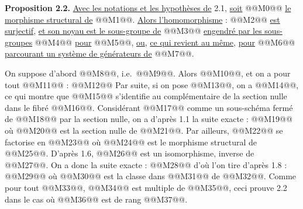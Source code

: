 
\textbf{Proposition 2.2.} \uline{Avec les notations et les hypothèses de} 2.1, \uline{soit} @@M0@@ \uline{le morphisme structural de} @@M1@@. \uline{Alors l'homomorphisme} :
@@M2@@
\uline{est surjectif}, \uline{et son noyau est le sous-groupe de} @@M3@@ \uline{engendré par les sous-groupes} @@M4@@ \uline{pour} @@M5@@, \uline{ou}, \uline{ce qui revient au même}, \uline{pour} @@M6@@ \uline{parcourant un système de générateurs de} @@M7@@.

On suppose d'abord @@M8@@, i.e.\ @@M9@@. Alors @@M10@@, et on a pour tout @@M11@@ :
@@M12@@
Par suite, si on pose @@M13@@, on a @@M14@@, ce qui montre que @@M15@@ s'identifie au complémentaire de la section nulle dans le fibré @@M16@@. Considérant @@M17@@ comme un sous-schéma fermé de @@M18@@ par la section nulle, on a d'après 1.1 la suite exacte :
@@M19@@
où @@M20@@ est la section nulle de @@M21@@. Par ailleurs, @@M22@@ se factorise en @@M23@@ où @@M24@@ est le morphisme structural de @@M25@@. D'après 1.6, @@M26@@ est un isomorphisme, inverse de @@M27@@. On a donc la suite exacte :
@@M28@@
d'où l'on tire d'après 1.8 :
@@M29@@
où @@M30@@ est la classe dans @@M31@@ de @@M32@@. Comme pour tout @@M33@@, @@M34@@ est multiple de @@M35@@, ceci prouve 2.2 dans le cas où @@M36@@ est de rang @@M37@@.

